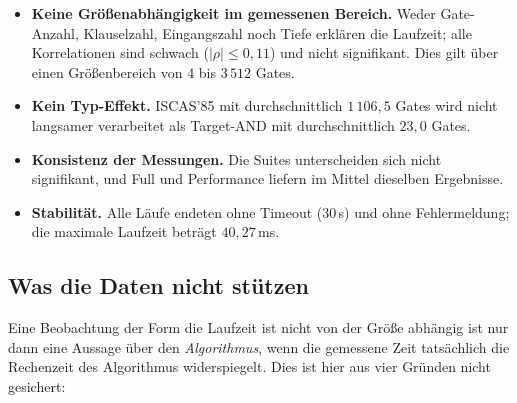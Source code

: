 \documentclass[a4paper,12pt]{article}
\theoremstyle{definition}
\begin{document}
\begin{itemize}
	\item \textbf{Keine Größenabhängigkeit im gemessenen Bereich.} Weder Gate-Anzahl, Klauselzahl, Eingangszahl noch Tiefe erklären die Laufzeit; alle Korrelationen sind schwach ($|\rho| \le 0{,}11$) und nicht signifikant. Dies gilt über einen Größenbereich von $4$ bis $3\,512$ Gates.
	\item \textbf{Kein Typ-Effekt.} ISCAS'85 mit durchschnittlich $1\,106{,}5$ Gates wird nicht langsamer verarbeitet als Target-AND mit durchschnittlich $23{,}0$ Gates.
	\item \textbf{Konsistenz der Messungen.} Die Suites unterscheiden sich nicht signifikant, und Full und Performance liefern im Mittel dieselben Ergebnisse.
	\item \textbf{Stabilität.} Alle Läufe endeten ohne Timeout (30\,s) und ohne Fehlermeldung; die maximale Laufzeit beträgt $40{,}27$\,ms.
\end{itemize}

\subsection{Was die Daten nicht stützen}

Eine Beobachtung der Form \glqq die Laufzeit ist nicht von der Größe abhängig\grqq{} ist nur dann eine Aussage über den \emph{Algorithmus}, wenn die gemessene Zeit tatsächlich die Rechenzeit des Algorithmus widerspiegelt. Dies ist hier aus vier Gründen nicht gesichert:
\end{document}
